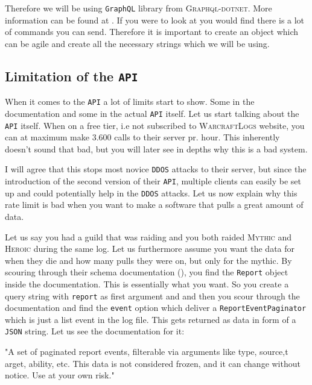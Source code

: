 \documentclass[10pt, a4paper]{memoir}
\numberwithin{equation}{section}
\theoremstyle{plain}
\theoremstyle{defp}
\theoremstyle{dotless}
\theoremstyle{definition}
\theoremstyle{dotless}
\theoremstyle{dotless}
\theoremstyle{defp}
\theoremstyle{defp}
\theoremstyle{be}          %
\theoremstyle{defp}
\newcommand\ttt[1]{\texttt{#1}}
\begin{document}
\medskip

Therefore we will be using \ttt{GraphQL} library from \textsc{Graphql-dotnet}. More information can be found at \cite{GQLdotnet}. If you were to look at \cite{DocLink} you would find there is a lot of commands you can send. Therefore it is important to create an object which can be agile and create all the necessary strings which we will be using.  

\subsection{Limitation of the \ttt{API}}

When it comes to the \ttt{API} a lot of limits start to show. Some in the documentation and some in the actual \ttt{API} itself. Let us start talking about the \ttt{API} itself. When on a free tier, i.e not subscribed to \textsc{WarcraftLogs} website, you can at maximum make 3.600 calls to their server pr. hour. This inherently doesn't sound that bad, but you will later see in depths why this is a bad system. 

\medskip

I will agree that this stops most novice \ttt{DDOS} attacks to their server, but since the introduction of the second version of their \ttt{API}, multiple clients can easily be set up and could potentially help in the \ttt{DDOS} attacks. Let us now explain why this rate limit is bad when you want to make a software that pulls a great amount of data. 

\medskip

Let us say you had a guild that was raiding and you both raided \textsc{Mythic} and \textsc{Heroic} during the same log. Let us furthermore assume you want the data for when they die and how many pulls they were on, but only for the mythic. By scouring through their schema documentation (\cite{DocLink}), you find the \ttt{Report} object inside the documentation. This is essentially what you want. So you create a query string with \ttt{report} as first argument and and then you scour through the documentation and find the \ttt{event} option which deliver a \ttt{ReportEventPaginator} which is just a list event in the log file. This gets returned as data in form of a \ttt{JSON} string. Let us see the documentation for it:

\begin{displayquote}
"A set of paginated report events, filterable via arguments like type, source,t arget, ability, etc. This data is not considered frozen, and it can change without notice. Use at your own risk."
\end{displayquote}
\end{document}

